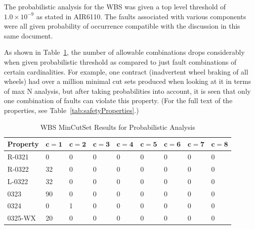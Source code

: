 The probabilistic analysis for the WBS was given a top level threshold of $1.0 \times 10^{-9}$ as stated in AIR6110. The faults associated with various components were all given probability of occurrence compatible with the discussion in this same document. 

As shown in Table~\ref{tab:wbs_prob_results}, the number of allowable combinations drops considerably when given probabilistic threshold as compared to just fault combinations of certain cardinalities. For example, one contract (inadvertent wheel braking of all wheels) had over a million minimal cut sets produced when looking at it in terms of max N analysis, but after taking probabilities into account, it is seen that only one combination of faults can violate this property. (For the full text of the properties, see Table~\ref{tab:safetyProperties}.)

\begin{center}
\begin{table}[h]
    \begin{tabular}{ | l | l | l | l | l | l | l | l | l |}
    \hline
    \textbf{Property} & $\bm{c = 1}$ & $\bm{c = 2}$ & $\bm{c = 3}$ & $\bm{c = 4}$ 
		& $\bm{c = 5}$ & $\bm{c = 6}$ & $\bm{c = 7}$ & $\bm{c = 8}$  \\ \hline \hline
    R-0321 & 0 & 0 & 0 & 0 & 0 & 0 & 0 & 0 \\ \hline
    R-0322 & 32 & 0 & 0 &0 &0 &0 &0& 0  \\ \hline
    L-0322 & 32 & 0 & 0 & 0 & 0 & 0 & 0 & 0  \\ \hline
    0323 & 90 & 0 & 0 & 0 & 0 & 0 & 0 & 0  \\ \hline
    0324 & 0 & 1 & 0 & 0 & 0 & 0 & 0 & 0  \\ \hline
    0325-WX & 20 & 0 & 0 &0 &0 & 0 & 0 & 0  \\ \hline
    \end{tabular}
    \caption{WBS MinCutSet Results for Probabilistic Analysis}
    \label{tab:wbs_prob_results}
\end{table}
\end{center}

